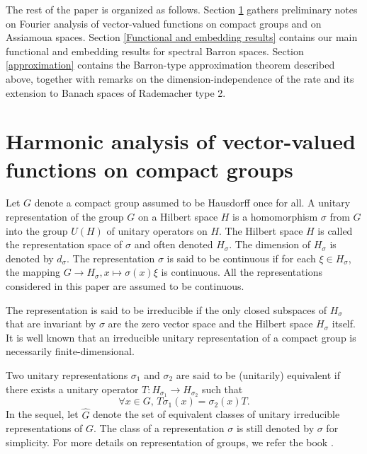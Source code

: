 \documentclass[12pt]{amsart}%
\begin{document}
The rest of the paper is organized as follows. Section \ref{Harmonic analysis of vector-valued function on compact groups} gathers
preliminary notes on Fourier analysis of vector-valued functions on compact
groups and on Assiamoua spaces. Section \ref{Functional and embedding results} contains our main functional and
embedding results for spectral Barron spaces. Section \ref{approximation} contains the Barron-type approximation theorem described above, together with remarks on
the dimension-independence of the rate and its extension to Banach spaces of Rademacher type 2.

 

\section{Harmonic analysis of vector-valued functions on compact groups}\label{Harmonic analysis of vector-valued function on compact groups}

Let $G$ denote a compact group assumed to be Hausdorff once for all. A unitary representation of the group $G$ on a Hilbert space $H$ is a  homomorphism $\sigma$ from  $G$ into the group $U(H)$ of unitary operators on $H$. The Hilbert space $H$ is called the representation space of $\sigma$ and often denoted $H_\sigma$.  The dimension of $H_\sigma$ is denoted by $d_\sigma$. The representation $\sigma$ is said to be continuous if for each $\xi\in H_\sigma$,  the mapping $G\rightarrow H_\sigma, x\mapsto \sigma(x)\xi$ is continuous. All the representations considered in this paper are assumed to be continuous.  


The representation is said to be irreducible if the only closed  subspaces  of $H_\sigma$ that are invariant by $\sigma$ are the zero vector space and the Hilbert space $H_\sigma$ itself. 
It is well known that an irreducible unitary representation of a compact group is necessarily finite-dimensional. 

Two unitary  representations $\sigma_1$ and   $\sigma_2$ are said to be (unitarily) equivalent if there exists a unitary operator $T : H_{\sigma_1} \rightarrow H_{\sigma_2}$ such that 
$$\forall x\in G, \, T\sigma_1 (x)=\sigma_2 (x)T.$$
In the sequel, let $\widehat{G}$ denote the set of equivalent classes of unitary irreducible representations of $G$. The class of a representation $\sigma$ is still denoted by $\sigma$ for simplicity. For more details on representation of groups, we refer the book \cite{Folland}.
\end{document}
